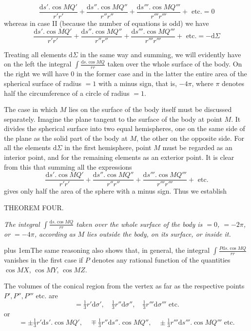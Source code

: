 \[
\frac{\mathrm{d}s'.\cos MQ'}{r'r'}+\frac{\mathrm{d}s''.\cos MQ''}{r''r''}+\frac{\mathrm{d}s'''.\cos MQ'''}{r'''r'''}+\text{ etc.}=0
\]
whereas in case II (because the number of equations is odd) we have
\[
\frac{\mathrm{d}s'.\cos MQ'}{r'r'}+\frac{\mathrm{d}s''.\cos MQ''}{r''r''}+\frac{\mathrm{d}s'''.\cos MQ'''}{r'''r'''}+\text{ etc.}=-\mathrm{d}\Sigma
\]
\par
Treating all elements $\mathrm{d}\Sigma$ in the same way and summing, we will evidently have on the left the integral $\int\frac{\mathrm{d}s.\cos MQ}{rr}$ taken over the whole surface of the body. On the right we will have $0$ in the former case and in the latter the entire area of the spherical surface of radius $=1$ with a minus sign, that is, $-4\pi$, where $\pi$ denotes half the circumference of a circle of radius $=1$.

The case in which $M$ lies on the surface of the body itself must be discussed separately. Imagine the plane tangent to the surface of the body at point $M$. It divides the spherical surface into two equal hemispheres, one on the same side of the plane as the solid part of the body at $M$, the other on the opposite side. For all the elements $\mathrm{d}\Sigma$ in the first hemisphere, point $M$ must be regarded as an interior point, and for the remaining elements as an exterior point. It is clear from this that summing all the expressions
\[
\frac{\mathrm{d}s'.\cos MQ'}{r'r'}+\frac{\mathrm{d}s''.\cos MQ''}{r''r''}+\frac{\mathrm{d}s'''.\cos MQ'''}{r'''r'''}+\text{ etc.}
\]
gives only half the area of the sphere with a minus sign. Thus we establish
\par\medskip{}
\begin{center}THEOREM FOUR.\end{center}
\par
\textit{The integral $\int\frac{\mathrm{d}s.\cos MQ}{rr}$ taken over the whole surface of the body is $=0$, $=-2\pi$, or $=-4\pi$, according as $M$ lies outside the body, on its surface, or inside it.}
\par
{\rightskip=0pt plus 1em\noindent\hspace*{\parindent}The same reasoning also shows that, in general, the integral $\int\frac{P\mathrm{d}s.\cos MQ}{rr}$ vanishes in the first case if $P$ denotes any rational function of the quantities $\cos MX$, $\cos MY$, $\cos MZ$.\par}

\par
The volumes of the conical region from the vertex as far as the respective points $P',P'',P'''$ etc. are
\[
=\tfrac13r'\mathrm{d}\sigma',\quad\tfrac13r''\mathrm{d}\sigma'',\quad\tfrac13r'''\mathrm{d}\sigma'''\text{ etc.}
\]
or
\[
=\pm\tfrac13r'\mathrm{d}s'.\cos MQ',\quad\mp\tfrac13r''\mathrm{d}s''.\cos MQ'',\quad\pm\tfrac13r'''\mathrm{d}s'''.\cos MQ'''\text{ etc.}
\]

